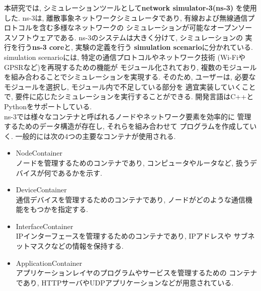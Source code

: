 本研究では, シミュレーションツールとして\textbf{network simulator-3(ns-3)}
\cite{ns-3}を使用した. ns-3は, 離散事象ネットワークシミュレータであり, 
有線および無線通信プロトコルを含む多様なネットワークの
シミュレーションが可能なオープンソースソフトウェアである. 
ns-3のシステムは大きく分けて, シミュレーションの
実行を行う\textbf{ns-3 core}と, 実験の定義を行う
\textbf{simulation scenario}に分かれている. simulation scenarioには, 
特定の通信プロトコルやネットワーク技術 (Wi-FiやGPSRなど)を再現するための機能が
モジュール化されており, 複数のモジュールを組み合わることでシミュレーションを実現する. 
そのため, ユーザーは, 必要なモジュールを選択し, モジュール内で不足している部分を
適宜実装していくことで, 要件に応じたシミュレーションを実行することができる. 
開発言語はC++とPythonをサポートしている. \\
\indent ns-3では様々なコンテナと呼ばれるノードやネットワーク要素を効率的に
管理するためのデータ構造が存在し, それらを組み合わせて
プログラムを作成していく. 一般的には次の4つの主要なコンテナが使用される.
\begin{itemize}
  \item NodeContainer\\ 
  \indent ノードを管理するためのコンテナであり, 
  コンピュータやルータなど, 扱うデバイスが何であるかを示す. 
  \item DeviceContainer\\
  \indent 通信デバイスを管理するためのコンテナであり, 
  ノードがどのような通信機能をもつかを指定する. 
  \item InterfaceContainer\\
  \indent IPインターフェースを管理するためのコンテナであり, IPアドレスや
  サブネットマスクなどの情報を保持する.
  \item ApplicationContainer\\
  \indent アプリケーションレイヤのプログラムやサービスを管理するための
  コンテナであり, HTTPサーバやUDPアプリケーションなどが用意されている.
\end{itemize}
